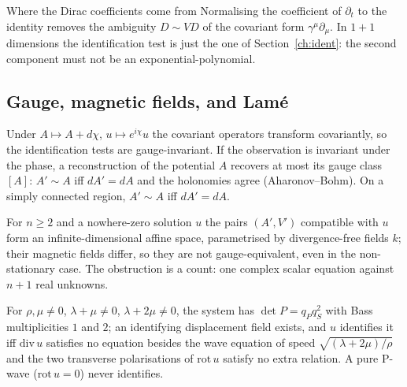 \begin{example}{Where the Dirac coefficients come from}
Normalising the coefficient of $\partial_t$ to the identity removes the ambiguity $D\sim VD$ of the covariant form $\gamma^\mu\partial_\mu$. In $1+1$ dimensions the identification test is just the one of Section~\ref{ch:ident}: the second component must not be an exponential-polynomial.
\end{example}

\subsection{Gauge, magnetic fields, and Lam\'e}

\begin{proposition}\label{prop:gauge}
Under $A\mapsto A+d\chi$, $u\mapsto e^{i\chi}u$ the covariant operators transform covariantly, so the identification tests are gauge-invariant. If the observation is invariant under the phase, a reconstruction of the potential $A$ recovers at most its gauge class $[A]$: $A'\sim A$ iff $dA'=dA$ and the holonomies agree (Aharonov--Bohm). On a simply connected region, $A'\sim A$ iff $dA'=dA$.
\end{proposition}

\begin{proposition}\label{prop:sysn3}
For $n\ge2$ and a nowhere-zero solution $u$ the pairs $(A',V')$ compatible with $u$ form an infinite-dimensional affine space, parametrised by divergence-free fields $k$; their magnetic fields differ, so they are not gauge-equivalent, even in the non-stationary case. The obstruction is a count: one complex scalar equation against $n+1$ real unknowns.
\end{proposition}

\begin{proposition}\label{prop:lame3}
For $\rho,\mu\ne0$, $\lambda+\mu\ne0$, $\lambda+2\mu\ne0$, the system has $\det P=q_Pq_S^2$ with Bass multiplicities $1$ and $2$; an identifying displacement field exists, and $u$ identifies it iff $\mathrm{div}\,u$ satisfies no equation besides the wave equation of speed $\sqrt{(\lambda+2\mu)/\rho}$ and the two transverse polarisations of $\mathrm{rot}\,u$ satisfy no extra relation. A pure P-wave ($\mathrm{rot}\,u=0$) never identifies.
\end{proposition}

